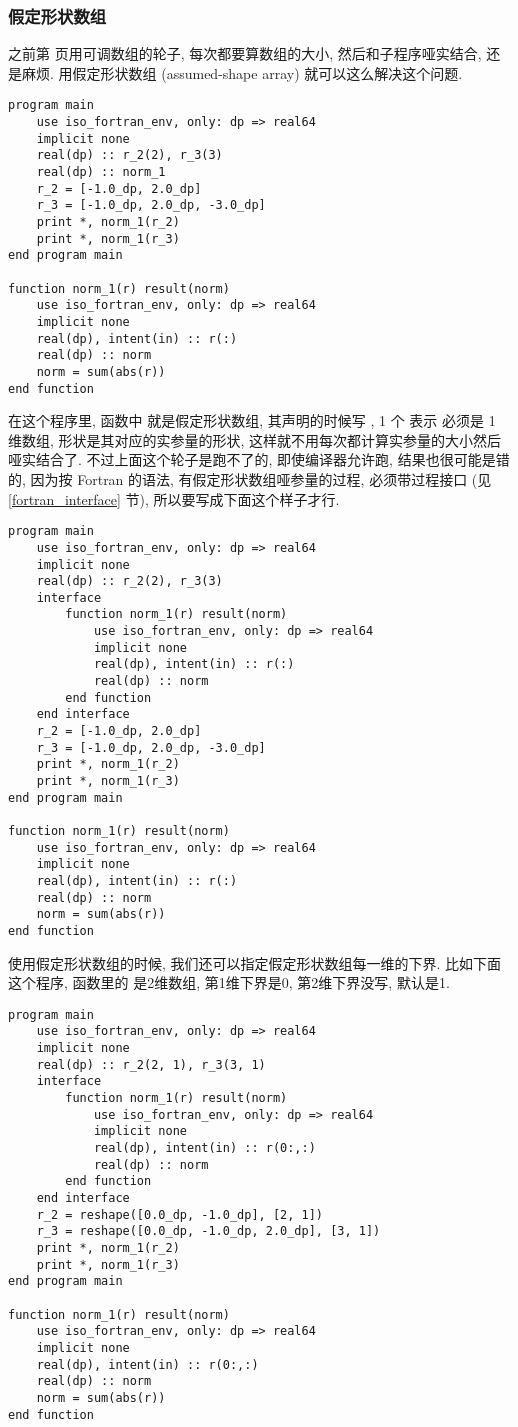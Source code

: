 \subsubsection{假定形状数组} \label{assumed-shape} 

之前第 \pageref{adjustable_array} 页用可调数组的轮子, 每次都要算数组的大小, 然后和子程序哑实结合, 还是麻烦. 用假定形状数组 (assumed-shape array) 就可以这么解决这个问题. 
\begin{lstlisting} 
program main
    use iso_fortran_env, only: dp => real64
    implicit none
    real(dp) :: r_2(2), r_3(3)
    real(dp) :: norm_1
    r_2 = [-1.0_dp, 2.0_dp]
    r_3 = [-1.0_dp, 2.0_dp, -3.0_dp]
    print *, norm_1(r_2)
    print *, norm_1(r_3)
end program main

function norm_1(r) result(norm)
    use iso_fortran_env, only: dp => real64
    implicit none
    real(dp), intent(in) :: r(:)
    real(dp) :: norm
    norm = sum(abs(r))
end function
\end{lstlisting} 
在这个程序里, 函数中  就是假定形状数组, 其声明的时候写 , 1 个 \ttt{:} 表示  必须是 1 维数组, 形状是其对应的实参量的形状, 这样就不用每次都计算实参量的大小然后哑实结合了. 不过上面这个轮子是跑不了的, 即使编译器允许跑, 结果也很可能是错的, 因为按 Fortran 的语法, 有假定形状数组哑参量的过程, 必须带过程接口 (见 \ref{fortran_interface} 节), 所以要写成下面这个样子才行.\label{assumed-shape_array_program} 
\begin{lstlisting} 
program main
    use iso_fortran_env, only: dp => real64
    implicit none
    real(dp) :: r_2(2), r_3(3)
    interface
        function norm_1(r) result(norm)
            use iso_fortran_env, only: dp => real64
            implicit none
            real(dp), intent(in) :: r(:)
            real(dp) :: norm
        end function
    end interface
    r_2 = [-1.0_dp, 2.0_dp]
    r_3 = [-1.0_dp, 2.0_dp, -3.0_dp]
    print *, norm_1(r_2)
    print *, norm_1(r_3)
end program main

function norm_1(r) result(norm)
    use iso_fortran_env, only: dp => real64
    implicit none
    real(dp), intent(in) :: r(:)
    real(dp) :: norm
    norm = sum(abs(r))
end function
\end{lstlisting} 
使用假定形状数组的时候, 我们还可以指定假定形状数组每一维的下界. 比如下面这个程序, 函数里的  是2维数组, 第1维下界是0, 第2维下界没写, 默认是1. 
\begin{lstlisting} 
program main
    use iso_fortran_env, only: dp => real64
    implicit none
    real(dp) :: r_2(2, 1), r_3(3, 1)
    interface
        function norm_1(r) result(norm)
            use iso_fortran_env, only: dp => real64
            implicit none
            real(dp), intent(in) :: r(0:,:)
            real(dp) :: norm
        end function
    end interface
    r_2 = reshape([0.0_dp, -1.0_dp], [2, 1])
    r_3 = reshape([0.0_dp, -1.0_dp, 2.0_dp], [3, 1])
    print *, norm_1(r_2)
    print *, norm_1(r_3)
end program main

function norm_1(r) result(norm)
    use iso_fortran_env, only: dp => real64
    implicit none
    real(dp), intent(in) :: r(0:,:)
    real(dp) :: norm
    norm = sum(abs(r))
end function
\end{lstlisting} 

